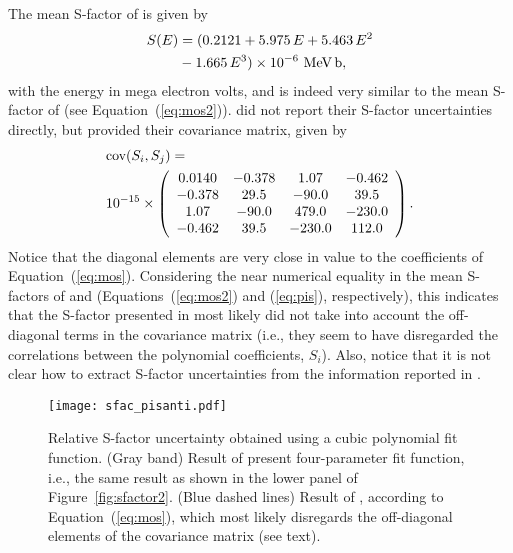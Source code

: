 \documentclass[twocolumn]{aastex63}
\begin{document}
The mean S-factor of \citet{Pis21} is given by
%
\begin{align}
S(E) & = (0.2121 + 5.975\,E + 5.463\,E^2 \notag \\
& - 1.665\,E^3) \times 10^{-6} ~ \text{MeV\,b}, \label{eq:pis}
\end{align}
%
with the energy in mega electron volts, and is indeed very similar to the mean S-factor of \citet{Mossa20} (see Equation~(\ref{eq:mos2})). \citet{Pis21} did not report their S-factor uncertainties directly, but provided their covariance matrix, given by
%
\begin{align}
& \text{cov}(S_i,S_j) = \notag \\
& 10^{-15} \times \left(
\begin{array}{cccc}
0.0140   & -0.378  & 1.07   & -0.462  \\
-0.378   & 29.5    & -90.0  & 39.5  \\
1.07     & -90.0   & 479.0  & -230.0 \\
-0.462   & 39.5    & -230.0 & 112.0 
\label{eq:covar}
\end{array}
\right).
\end{align}
%
Notice that the diagonal elements are very close in value to the coefficients of Equation~(\ref{eq:mos}). Considering the near numerical equality in the mean S-factors of \citet{Mossa20} and \citet{Pis21} (Equations~(\ref{eq:mos2}) and (\ref{eq:pis}), respectively), this indicates that the S-factor presented in \citet{Mossa20} most likely did not take into account the off-diagonal terms in the covariance matrix (i.e., they seem to have disregarded the correlations between the polynomial coefficients, $S_i$). Also, notice that it is not clear how to extract S-factor uncertainties from the information reported in \citet{Pis21}.

%
\begin{figure}
\texttt{[image: sfac\_pisanti.pdf]}
\caption{Relative S-factor uncertainty obtained using a cubic polynomial fit function. (Gray band) Result of present four-parameter fit function, i.e., the same result as shown in the lower panel of Figure~\ref{fig:sfactor2}. (Blue dashed lines) Result of \citet{Mossa20}, according to Equation~(\ref{eq:mos}), which most likely disregards the off-diagonal elements of the covariance matrix (see text).
}
\label{fig:covar}
\end{figure}



\end{document}

